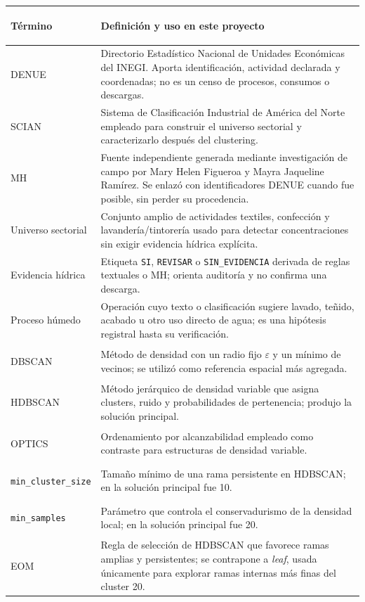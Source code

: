 \documentclass[11pt,letterpaper]{article}
\begin{document}
\footnotesize
\begin{longtable}{>{\bfseries\raggedright\arraybackslash}p{}>{\raggedright\arraybackslash}p{}}
\toprule
Término & Definición y uso en este proyecto \\
\midrule
DENUE & Directorio Estadístico Nacional de Unidades Económicas del INEGI. Aporta identificación, actividad declarada y coordenadas; no es un censo de procesos, consumos o descargas. \\
SCIAN & Sistema de Clasificación Industrial de América del Norte empleado para construir el universo sectorial y caracterizarlo después del clustering. \\
MH & Fuente independiente generada mediante investigación de campo por Mary Helen Figueroa y Mayra Jaqueline Ramírez. Se enlazó con identificadores DENUE cuando fue posible, sin perder su procedencia. \\
Universo sectorial & Conjunto amplio de actividades textiles, confección y lavandería/tintorería usado para detectar concentraciones sin exigir evidencia hídrica explícita. \\
Evidencia hídrica & Etiqueta \texttt{SI}, \texttt{REVISAR} o \texttt{SIN\_EVIDENCIA} derivada de reglas textuales o MH; orienta auditoría y no confirma una descarga. \\
Proceso húmedo & Operación cuyo texto o clasificación sugiere lavado, teñido, acabado u otro uso directo de agua; es una hipótesis registral hasta su verificación. \\
DBSCAN & Método de densidad con un radio fijo $\varepsilon$ y un mínimo de vecinos; se utilizó como referencia espacial más agregada. \\
HDBSCAN & Método jerárquico de densidad variable que asigna clusters, ruido y probabilidades de pertenencia; produjo la solución principal. \\
OPTICS & Ordenamiento por alcanzabilidad empleado como contraste para estructuras de densidad variable. \\
\texttt{min\_cluster\_size} & Tamaño mínimo de una rama persistente en HDBSCAN; en la solución principal fue 10. \\
\texttt{min\_samples} & Parámetro que controla el conservadurismo de la densidad local; en la solución principal fue 20. \\
EOM & Regla de selección de HDBSCAN que favorece ramas amplias y persistentes; se contrapone a \emph{leaf}, usada únicamente para explorar ramas internas más finas del cluster 20. \\

\end{longtable}
\end{document}
